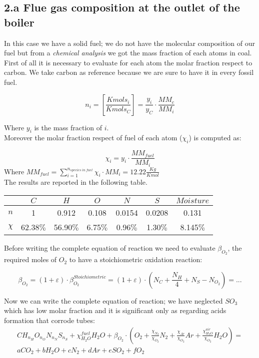 \documentclass[a4paper,12pt]{article}
\begin{document}
{\subsection*{2.a Flue gas composition at the outlet of the boiler} 
In this case we have a solid fuel; we do not have the molecular composition of our fuel but from a \emph{chemical analysis} we got the mass fraction of each atoms in coal. First of all it is necessary to evaluate for each atom the molar fraction respect to carbon. We take carbon as reference because we are sure to have it in every fossil fuel.

\begin{equation}
n_i = \left[\frac{Kmols_i}{Kmols_C}\right] = \frac{y_i}{y_C}
 \cdot \frac{MM_c}{MM_i}
\end{equation}

Where $y_i$ is the mass fraction of $i$.\\ Moreover the molar fraction respect of fuel of each atom ($\chi_i$) is computed as:

\begin{equation}
\chi_i = y_i
 \cdot \frac{MM_{fuel}}{MM_i}
\end{equation}
Where $ {MM_{fuel}} = \sum_{i=1}^{n_{species\ in\ fuel}}\chi_i \cdot MM_i = 12.22 \frac{Kg}{Kmol}$  \\

The results are reported in the following table.
\begin{center}
\begin{tabu}{|c|c|c|c|c|c|c|}
\hline
     & $ C $ & $ H $ & $ O $ & $ N $ & $ S $ & $Moisture$\\ \hline
 $n$ & 1 & 0.912 & 0.108 & 0.0154 & 0.0208 & 0.131 
\\ \hline
 $\chi$ & 62.38$\%$ & 56.90$\%$ & 6.75$\%$ & 0.96$\%$ & 1.30$\%$ & 8.145$\%$
 \\ \hline
\end{tabu}
\end{center}
Before writing the complete equation of reaction we need to evaluate $\beta_{O_2}$, the required moles of $O_2$ to have a stoichiometric oxidation reaction:

\begin{equation}
\beta_{O_2} = (1+\varepsilon) \cdot \beta_{O_2}^{Stoichiometric} 
=(1+\varepsilon) \cdot \left( N_C + \frac{N_H}{4} + N_S - N_{O_2} \right)= ...
\end{equation}

Now we can write the complete equation of reaction; we have neglected $SO_3$ which has low molar fraction and it is significant only as regarding acids formation that corrode tubes:
\begin{equation}
\begin{split}
CH_{n_H}O_{n_O}N_{n_N}S_{n_S} +\chi^{fuel}_{H_2O}H_2O + \beta_{O_2} \cdot
(O_2 + \frac{\chi_{N_2}}{\chi_{O_2}}N_2 + 
\frac{\chi_{Ar}}{\chi_{O_2}}Ar + \frac{\chi^{air}_{H_2O}}{\chi_{O_2}}H_2O
) = 
\\
aCO_2 + bH_2O + cN_2 + dAr + eSO_2 + fO_2
\end{split}
\end{equation}

}
\end{document}
